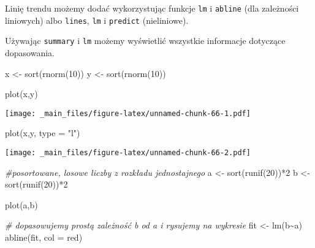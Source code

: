\documentclass[
]{book}
\newenvironment{Shaded}{\begin{snugshade}}{\end{snugshade}}
\newcommand{\AttributeTok}[1]{\textcolor[rgb]{0.77,0.63,0.00}{#1}}
\newcommand{\CommentTok}[1]{\textcolor[rgb]{0.56,0.35,0.01}{\textit{#1}}}
\newcommand{\DecValTok}[1]{\textcolor[rgb]{0.00,0.00,0.81}{#1}}
\newcommand{\FunctionTok}[1]{\textcolor[rgb]{0.00,0.00,0.00}{#1}}
\newcommand{\NormalTok}[1]{#1}
\newcommand{\OtherTok}[1]{\textcolor[rgb]{0.56,0.35,0.01}{#1}}
\newcommand{\SpecialCharTok}[1]{\textcolor[rgb]{0.00,0.00,0.00}{#1}}
\newcommand{\StringTok}[1]{\textcolor[rgb]{0.31,0.60,0.02}{#1}}
\begin{document}
Linię trendu możemy dodać wykorzystując funkcje \texttt{lm} i \texttt{abline} (dla zależności liniowych) albo \texttt{lines}, \texttt{lm} i \texttt{predict} (nieliniowe).

Używając \texttt{summary} i \texttt{lm} możemy wyświetlić wszystkie informacje dotyczące dopasowania.

\begin{Shaded}
\begin{Highlighting}[]
\NormalTok{x }\OtherTok{\textless{}{-}} \FunctionTok{sort}\NormalTok{(}\FunctionTok{rnorm}\NormalTok{(}\DecValTok{10}\NormalTok{))}
\NormalTok{y }\OtherTok{\textless{}{-}} \FunctionTok{sort}\NormalTok{(}\FunctionTok{rnorm}\NormalTok{(}\DecValTok{10}\NormalTok{))}

\FunctionTok{plot}\NormalTok{(x,y)}
\end{Highlighting}
\end{Shaded}

\texttt{[image: \_main\_files/figure-latex/unnamed-chunk-66-1.pdf]}

\begin{Shaded}
\begin{Highlighting}[]
\FunctionTok{plot}\NormalTok{(x,y, }\AttributeTok{type =} \StringTok{"l"}\NormalTok{)}
\end{Highlighting}
\end{Shaded}

\texttt{[image: \_main\_files/figure-latex/unnamed-chunk-66-2.pdf]}

\begin{Shaded}
\begin{Highlighting}[]
\CommentTok{\#posortowane, losowe liczby z rozkładu jednostajnego}
\NormalTok{a }\OtherTok{\textless{}{-}} \FunctionTok{sort}\NormalTok{(}\FunctionTok{runif}\NormalTok{(}\DecValTok{20}\NormalTok{))}\SpecialCharTok{*}\DecValTok{2}
\NormalTok{b }\OtherTok{\textless{}{-}} \FunctionTok{sort}\NormalTok{(}\FunctionTok{runif}\NormalTok{(}\DecValTok{20}\NormalTok{))}\SpecialCharTok{*}\DecValTok{2}

\FunctionTok{plot}\NormalTok{(a,b)}

\CommentTok{\# dopasowujemy prostą zależność b od a i rysujemy na wykresie}
\NormalTok{fit }\OtherTok{\textless{}{-}} \FunctionTok{lm}\NormalTok{(b}\SpecialCharTok{\textasciitilde{}}\NormalTok{a)}
\FunctionTok{abline}\NormalTok{(fit, }\AttributeTok{col =} \StringTok{\textquotesingle{}red\textquotesingle{}}\NormalTok{)}
\end{Highlighting}
\end{Shaded}
\end{document}
